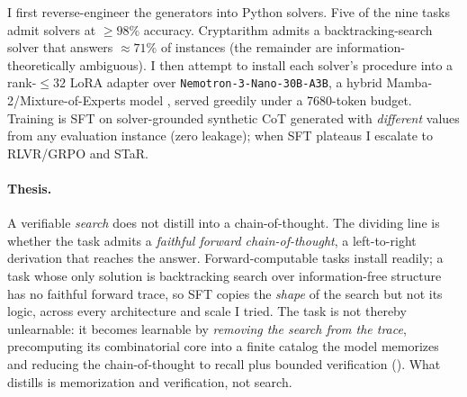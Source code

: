 \documentclass[11pt]{article}
\begin{document}
I first reverse-engineer the generators into Python solvers. Five of the nine tasks admit
solvers at $\geq\!98\%$ accuracy. Cryptarithm admits a backtracking-search solver that
answers $\approx\!71\%$ of instances (the remainder are information-theoretically
ambiguous). I then attempt to install each solver's procedure into a rank-$\leq\!32$
LoRA adapter \citep{hu2022lora} over \texttt{Nemotron-3-Nano-30B-A3B}, a hybrid
Mamba-2/Mixture-of-Experts model \citep{nemotron3nano2025, dao2024mamba2}, served greedily
under a 7680-token budget. Training is SFT on solver-grounded synthetic CoT generated with
\emph{different} values from any evaluation instance (zero leakage); when SFT plateaus I
escalate to RLVR/GRPO and STaR.

\paragraph{Thesis.} A verifiable \emph{search} does not distill into a chain-of-thought. The
dividing line is whether the task admits a \emph{faithful forward chain-of-thought}, a
left-to-right derivation that reaches the answer. Forward-computable tasks install readily; a task
whose only solution is backtracking search over information-free structure has no faithful forward
trace, so SFT copies the \emph{shape} of the search but not its logic, across every architecture
and scale I tried. The task is not thereby unlearnable: it becomes learnable by \emph{removing the
search from the trace}, precomputing its combinatorial core into a finite catalog the model
memorizes and reducing the chain-of-thought to recall plus bounded verification ().
What distills is memorization and verification, not search.
\end{document}
